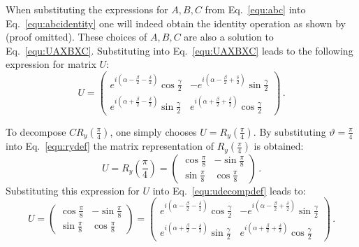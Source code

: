 When substituting the expressions for $A,B,C$ from Eq.~\ref{equ:abc} into Eq.~\ref{equ:abcidentity} one will indeed obtain the identity operation as shown by (proof omitted). These choices of $A,B,C$ are also a solution to Eq.~\ref{equ:UAXBXC}. Substituting into Eq.~\ref{equ:UAXBXC} leads to the following expression for matrix $U$:
\begin{equation}
\label{equ:udecompdef}
U = \begin{pmatrix}
 e^{i(\alpha-\frac{\beta}{2}-\frac{\delta}{2})}\cos{\frac{\gamma}{2}} & -e^{i(\alpha-\frac{\beta}{2}+\frac{\delta}{2})}\sin{\frac{\gamma}{2}} \\ 
e^{i(\alpha+\frac{\beta}{2}-\frac{\delta}{2})}\sin{\frac{\gamma}{2}} & e^{i(\alpha+\frac{\beta}{2}+\frac{\delta}{2})}\cos{\frac{\gamma}{2}}
 \end{pmatrix}\, .
\end{equation}

To decompose $CR_y(\frac{\pi}{4})$, one simply chooses $U = R_y(\frac{\pi}{4})$. By substituting $\vartheta = \frac{\pi}{4}$ into Eq.~\ref{equ:rydef} the matrix representation of $R_y(\frac{\pi}{4})$ is obtained:
\begin{equation}
U = R_y(\frac{\pi}{4}) = \begin{pmatrix}
\cos\frac{\pi}{8} & -\sin\frac{\pi}{8} \\
\sin\frac{\pi}{8} & \cos\frac{\pi}{8}
\end{pmatrix}\, .
\end{equation}
Substituting this expression for $U$ into Eq.~\ref{equ:udecompdef} leads to:
\begin{equation}
\label{equ:udecompsubbed}
U = \begin{pmatrix}
\cos\frac{\pi}{8} & -\sin\frac{\pi}{8} \\
\sin\frac{\pi}{8} & \cos\frac{\pi}{8}
\end{pmatrix} = \begin{pmatrix}
 e^{i(\alpha-\frac{\beta}{2}-\frac{\delta}{2})}\cos{\frac{\gamma}{2}} & -e^{i(\alpha-\frac{\beta}{2}+\frac{\delta}{2})}\sin{\frac{\gamma}{2}} \\ 
e^{i(\alpha+\frac{\beta}{2}-\frac{\delta}{2})}\sin{\frac{\gamma}{2}} & e^{i(\alpha+\frac{\beta}{2}+\frac{\delta}{2})}\cos{\frac{\gamma}{2}}
 \end{pmatrix}\, .
\end{equation}


